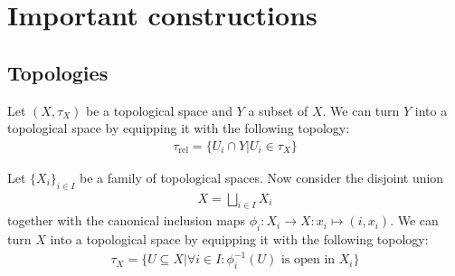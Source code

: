 
\section{Important constructions}
\subsection{Topologies}

    \begin{example}
        Let $(X, \tau_X)$ be a topological space and $Y$ a subset of $X$. We can turn $Y$ into a topological space by equipping it with the following topology:
        \begin{gather}
            \label{topology:relative_topology}
            \tau_\text{rel} = \{U_i\cap Y|U_i\in \tau_X\}
        \end{gather}
    \end{example}

    \begin{example}\label{topology:disjoint_union}
        Let $\{X_i\}_{i\in I}$ be a family of topological spaces. Now consider the disjoint union
        \begin{gather}
            X = \bigsqcup_{i\in I} X_i
        \end{gather}
        together with the canonical inclusion maps $\phi_i:X_i\rightarrow X:x_i\mapsto(i, x_i)$. We can turn $X$ into a topological space by equipping it with the following topology:
        \begin{gather}
            \tau_X = \{U\subseteq X| \forall i\in I:\phi_i^{-1}(U)\text{ is open in }X_i\}
        \end{gather}
    \end{example}

